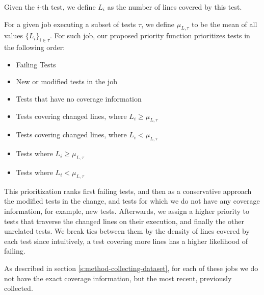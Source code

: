 Given the $i$-th test, we define $L_i$ as the number of lines covered by this test.

For a given job executing a subset of tests $\tau$, we define $\mu_{L,\tau}$ to be the mean of
all values $\{L_i\}_{i \in \tau}$. For such job, our proposed priority function prioritizes tests
in the following order:

\begin{itemize}
    \item Failing Tests
    \item New or modified tests in the job
    \item Tests that have no coverage information
    \item Tests covering changed lines, where $L_i \ge \mu_{L,\tau}$
    \item Tests covering changed lines, where $L_i < \mu_{L,\tau}$
    \item Tests where $L_i \ge \mu_{L,\tau}$
    \item Tests where $L_i < \mu_{L,\tau}$
\end{itemize}

This prioritization ranks first failing tests, and then as a conservative 
approach the modified tests in the change, and tests for which we do not have any coverage 
information, for example, new tests. Afterwards, we assign a higher priority to tests that
 traverse the changed lines on their execution, and finally the other unrelated tests.
 We break ties between them by the density of lines covered by each test since intuitively,
 a test covering more lines has a higher likelihood of failing.

As described in section \ref{s:method-collecting-dataset}, for each of these jobs we do not 
have the exact coverage information, but the most recent, previously collected. 
